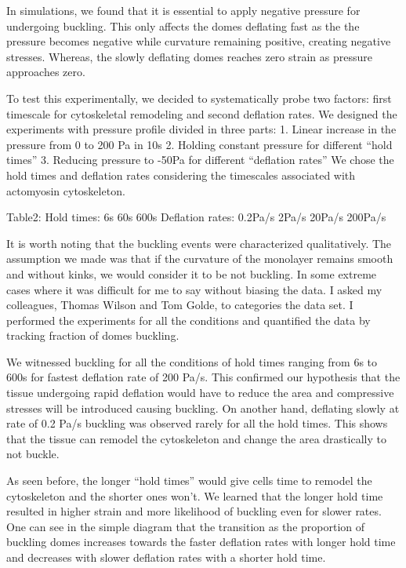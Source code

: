 In simulations, we found that it is essential to apply negative pressure
for undergoing buckling. This only affects the domes deflating fast as
the the pressure becomes negative while curvature remaining positive,
creating negative stresses. Whereas, the slowly deflating domes reaches
zero strain as pressure approaches zero.

To test this experimentally, we decided to systematically probe two
factors: first timescale for cytoskeletal remodeling and second
deflation rates. We designed the experiments with pressure profile
divided in three parts: 1. Linear increase in the pressure from 0 to 200
Pa in 10s 2. Holding constant pressure for different ``hold times'' 3.
Reducing pressure to -50Pa for different ``deflation rates'' We chose
the hold times and deflation rates considering the timescales associated
with actomyosin cytoskeleton.

Table2: Hold times: 6s 60s 600s Deflation rates: 0.2Pa/s 2Pa/s 20Pa/s
200Pa/s

It is worth noting that the buckling events were characterized
qualitatively. The assumption we made was that if the curvature of the
monolayer remains smooth and without kinks, we would consider it to be
not buckling. In some extreme cases where it was difficult for me to say
without biasing the data. I asked my colleagues, Thomas Wilson and Tom
Golde, to categories the data set. I performed the experiments for all
the conditions and quantified the data by tracking fraction of domes
buckling.

We witnessed buckling for all the conditions of hold times ranging from
6s to 600s for fastest deflation rate of 200 Pa/s. This confirmed our
hypothesis that the tissue undergoing rapid deflation would have to
reduce the area and compressive stresses will be introduced causing
buckling. On another hand, deflating slowly at rate of 0.2 Pa/s buckling
was observed rarely for all the hold times. This shows that the tissue
can remodel the cytoskeleton and change the area drastically to not
buckle.

As seen before, the longer ``hold times'' would give cells time to
remodel the cytoskeleton and the shorter ones won't. We learned that the
longer hold time resulted in higher strain and more likelihood of
buckling even for slower rates. One can see in the simple diagram that
the transition as the proportion of buckling domes increases towards the
faster deflation rates with longer hold time and decreases with slower
deflation rates with a shorter hold time.

